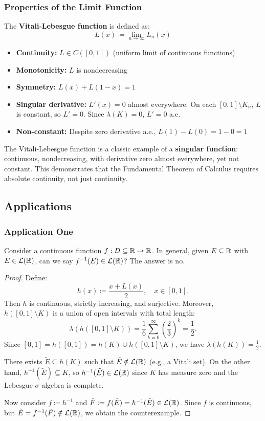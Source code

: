 \subsubsection{Properties of the Limit Function}

The \textbf{Vitali-Lebesgue function} is defined as:
\[
L(x) \coloneqq \lim_{n \to \infty} L_n(x)
\]

\begin{itemize}
    \item \textbf{Continuity:} $L \in C([0,1])$ (uniform limit of continuous functions)
    \item \textbf{Monotonicity:} $L$ is nondecreasing
    \item \textbf{Symmetry:} $L(x) + L(1-x) = 1$
    \item \textbf{Singular derivative:} $L'(x) = 0$ almost everywhere. On each $[0,1] \setminus K_n$, $L$ is constant, so $L' = 0$. Since $\lambda(K) = 0$, $L' = 0$ a.e.
    \item \textbf{Non-constant:} Despite zero derivative a.e., $L(1) - L(0) = 1 - 0 = 1$
\end{itemize}

\begin{remark}
The Vitali-Lebesgue function is a classic example of a \textbf{singular function}: continuous, nondecreasing, with derivative zero almost everywhere, yet not constant. This demonstrates that the Fundamental Theorem of Calculus requires absolute continuity, not just continuity.
\end{remark}

\subsection{Applications}

\subsubsection{Application One}
Consider a continuous function $f:D \subseteq \mathbb{R} \to \mathbb{R}$.
In general, given $E \subseteq \mathbb{R}$ with $E \in \mathcal{L}(\mathbb{R})$, can we say $f^{-1}(E) \in \mathcal{L}(\mathbb{R})$? The answer is no.

\begin{proof}
Define:
\[
h(x) \coloneqq \frac{x + L(x)}{2}, \quad x \in [0,1].
\]
Then $h$ is continuous, strictly increasing, and surjective.
Moreover, $h([0,1] \setminus K)$ is a union of open intervals with total length:
\[
\lambda(h([0,1] \setminus K)) = \frac{1}{6} \sum_{k=0}^{\infty} \left( \frac{2}{3} \right)^k = \frac{1}{2}.
\]
Since $[0,1] = h([0,1]) = h(K) \cup h([0,1] \setminus K)$, we have $\lambda(h(K)) = \frac{1}{2}$.

There exists $\tilde{E} \subseteq h(K)$ such that $\tilde{E} \notin \mathcal{L}(\mathbb{R})$ (e.g., a Vitali set).
On the other hand, $h^{-1}(\tilde{E}) \subseteq K$, so $h^{-1}(\tilde{E}) \in \mathcal{L}(\mathbb{R})$ since $K$ has measure zero and the Lebesgue $\sigma$-algebra is complete.

Now consider $f \coloneqq h^{-1}$ and $\tilde{F} \mathrel{\mathop:}= f(\tilde{E}) = h^{-1}(\tilde{E}) \in \mathcal{L}(\mathbb{R})$.
Since $f$ is continuous, but $\tilde{E} = f^{-1}(\tilde{F}) \notin \mathcal{L}(\mathbb{R})$, we obtain the counterexample.
\end{proof}

